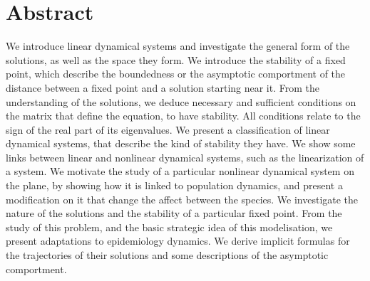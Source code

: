 \section*{Abstract}
We introduce linear dynamical systems and investigate the general form of the solutions, as well as the space they form. We introduce the stability of a fixed point, which describe the boundedness or the asymptotic comportment of the distance between a fixed point and a solution starting near it. From the understanding of the solutions, we deduce necessary and sufficient conditions on the matrix that define the equation, to have stability. All conditions relate to the sign of the real part of its eigenvalues. We present a classification of linear dynamical systems, that describe the kind of stability they have. We show some links between linear and nonlinear dynamical systems, such as the linearization of a system. We motivate the study of a particular nonlinear dynamical system on the plane, by showing how it is linked to population dynamics, and present a modification on it that change the affect between the species. We investigate the nature of the solutions and the stability of a particular fixed point. From the study of this problem, and the basic strategic idea of this modelisation, we present adaptations to epidemiology dynamics. We derive implicit formulas for the trajectories of their solutions and some descriptions of the asymptotic comportment.